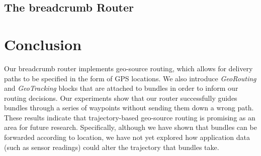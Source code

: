 \documentclass{sig-alternate}
\begin{document}






\subsection{The breadcrumb Router}



%
%




%
%
\section{Conclusion}

Our {\sc breadcrumb} router implements geo-source routing, which allows for delivery paths to be specified in the form of GPS locations. We also introduce {\em GeoRouting} and {\em GeoTracking} blocks that are attached to bundles in order to inform our routing decisions. Our experiments show that our router successfully guides bundles through a series of waypoints without sending them down a wrong path. These results indicate that trajectory-based geo-source routing is promising as an area for future research. Specifically, although we have shown that bundles can be forwarded according to location, we have not yet explored how application data (such as sensor readings) could alter the trajectory that bundles take.



%
%
%
%
%
%
%
%
%
%



\end{document}
